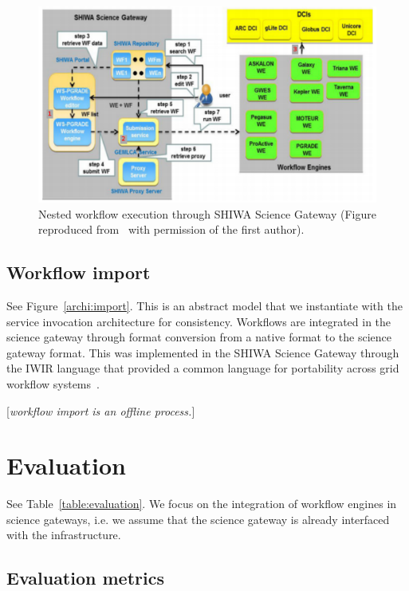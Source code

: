 \documentclass[preprint,3p,twocolumn]{elsarticle}
\newcommand{\todo}[1]{\color{blue}\xspace[\emph{#1}]\xspace\color{black}}
\begin{document}
\begin{figure}
\centering
\includegraphics[width=1.5\columnwidth]{figures/shiwa-science-gateway.pdf}
\caption{Nested workflow execution through SHIWA Science Gateway
  (Figure reproduced from~\cite{terstyanszky2014enabling} with
  permission of the first author).}
\label{fig:shiwa-architecture}
\end{figure}

\subsection{Workflow import}

See Figure~\ref{archi:import}. This is an abstract model that we
instantiate with the service invocation architecture for
consistency. Workflows are integrated in the science gateway through
format conversion from a native format to the science gateway
format. This was implemented in the SHIWA Science Gateway through
the IWIR language that provided a common language for portability
across grid workflow
systems~\cite{plankensteiner-prodan-etal:2013}.

\todo{workflow import is an offline process.}

\section{Evaluation}

See Table~\ref{table:evaluation}. We focus on the integration of
workflow engines in science gateways, i.e. we assume that the science
gateway is already interfaced with the infrastructure.

\subsection{Evaluation metrics}
\end{document}
